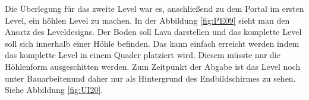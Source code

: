 Die Überlegung für das zweite Level war es, anschließend zu dem Portal im ersten Level, ein höhlen Level zu machen. In der Abbildung \ref{fig:PE09} sieht man den Ansatz des Leveldesigns. Der Boden soll Lava darstellen und das komplette Level soll sich innerhalb einer Höhle befinden. 
Das kann einfach erreicht werden indem das komplette Level in einem Quader platziert wird. Diesem müsste nur die Höhlenform ausgeschitten werden. Zum Zeitpunkt der Abgabe ist das Level noch unter \glqq Bauarbeiten\grqq \space und daher nur als Hintergrund des Endbildschirmes zu sehen. Siehe Abbildung \ref{fig:UI20}.



\pagebreak

